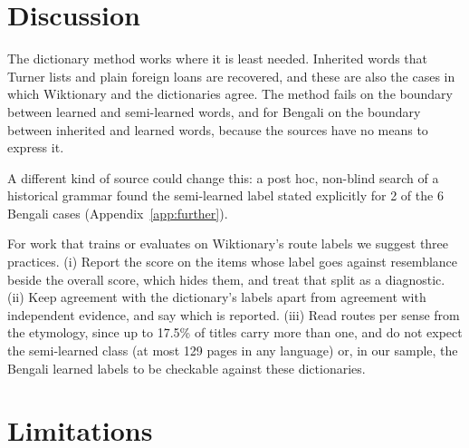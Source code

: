 \documentclass[11pt]{article}
\begin{document}
\section{Discussion}

The dictionary method works where it is least needed. Inherited words that Turner lists and plain foreign loans are recovered, and these are also the cases in which Wiktionary and the dictionaries agree. The method fails on the boundary between learned and semi-learned words, and for Bengali on the boundary between inherited and learned words, because the sources have no means to express it.

A different kind of source could change this: a post hoc, non-blind search of a historical grammar found the semi-learned label stated explicitly for 2 of the 6 Bengali cases (Appendix~\ref{app:further}).

For work that trains or evaluates on Wiktionary's route labels we suggest three practices. (i) Report the score on the items whose label goes against resemblance beside the overall score, which hides them, and treat that split as a diagnostic. (ii) Keep agreement with the dictionary's labels apart from agreement with independent evidence, and say which is reported. (iii) Read routes per sense from the etymology, since up to 17.5\% of titles carry more than one, and do not expect the semi-learned class (at most 129 pages in any language) or, in our sample, the Bengali learned labels to be checkable against these dictionaries.

\section*{Limitations}
\end{document}
